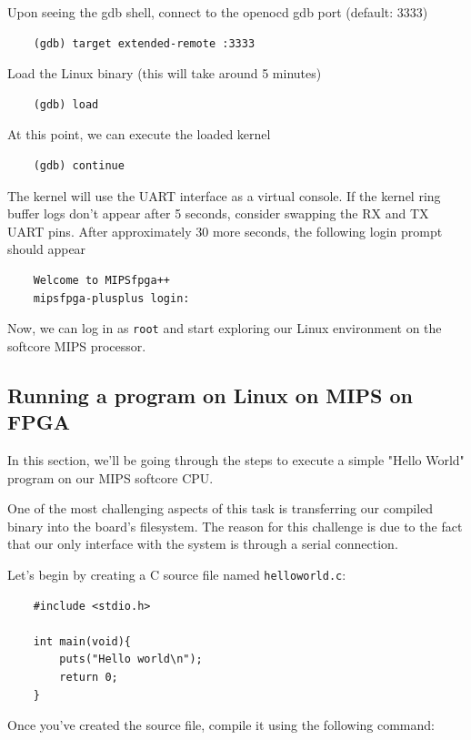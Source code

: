\documentclass[a4paper]{article}
\let\oldtexttt\texttt
\renewcommand{\texttt}[1]{\textcolor{mygray}{\oldtexttt{#1}}}
\begin{document}
Upon seeing the gdb shell, connect to the openocd gdb port (default: 3333)

\begin{lstlisting}
    (gdb) target extended-remote :3333
\end{lstlisting}

Load the Linux binary (this will take around 5 minutes)

\begin{lstlisting}
    (gdb) load
\end{lstlisting}

At this point, we can execute the loaded kernel

\begin{lstlisting}
    (gdb) continue
\end{lstlisting}

The kernel will use the UART interface as a virtual console. If the kernel ring
buffer logs don't appear after 5 seconds, consider swapping the RX and TX UART
pins. After approximately 30 more seconds, the following login prompt should appear

\begin{lstlisting}
    Welcome to MIPSfpga++
    mipsfpga-plusplus login:
\end{lstlisting}

Now, we can log in as \texttt{root} and start exploring our Linux environment on the softcore MIPS processor.

\subsection{Running a program on Linux on MIPS on FPGA}

In this section, we'll be going through the steps to execute a simple "Hello
World" program on our MIPS softcore CPU.

One of the most challenging aspects of this task is transferring our compiled
binary into the board's filesystem. The reason for this challenge is due to the
fact that our only interface with the system is through a serial connection.

Let's begin by creating a C source file named \texttt{helloworld.c}:

\begin{lstlisting}
    #include <stdio.h>

    int main(void){
        puts("Hello world\n");
        return 0;
    }
\end{lstlisting}

Once you've created the source file, compile it using the following command:
\end{document}
